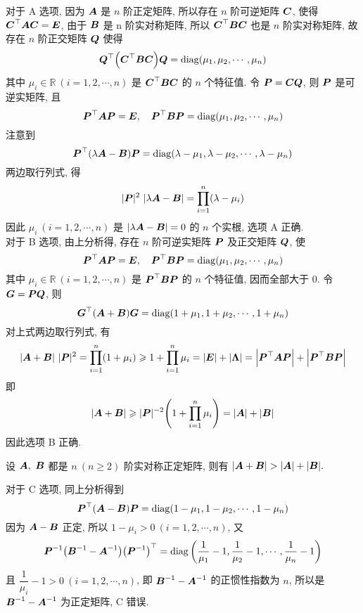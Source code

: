 \begin{solution}
    对于 A 选项, 因为 $\vb*{A}$ 是 $n$ 阶正定矩阵, 所以存在 $n$ 阶可逆矩阵 $\vb*{C}$, 使得 $\vb*{C}^\top\vb*{AC}=\vb*{E}$, 由于 $\vb*{B}$ 是 n 阶实对称矩阵, 所以 $\vb*{C}^\top\vb*{BC}$ 也是 $n$ 阶实对称矩阵, 故存在 $n$ 阶正交矩阵 $\vb*{Q}$ 使得 $$
    \vb*{Q}^\top\qty(\vb*{C}^\top\vb*{BC})\vb*{Q}=\operatorname{diag}(\mu_1, \mu_2, \cdots, \mu_n)
    $$
    其中 $\mu_i\in \mathbb{R}~(i=1,2, \cdots, n)$ 是 $\vb*{C}^\top\vb*{BC}$ 的 $n$ 个特征值. 令 $\vb*{P}=\vb*{CQ}$, 则 $\vb*{P}$ 是可逆实矩阵, 且 $$
    \vb*{P}^\top\vb*{AP}=\vb*{E},\quad \vb*{P}^\top\vb*{BP}=\operatorname{diag} (\mu_1, \mu_2, \cdots, \mu_n)
    $$
    注意到 $$
    \vb*{P}^\top(\lambda\vb*{A}-\vb*{B})\vb*{P}=\operatorname{diag} (\lambda-\mu_1, \lambda-\mu_2, \cdots, \lambda-\mu_n)
    $$
    两边取行列式, 得 $$
    |\vb*{P}|^2~|\lambda\vb*{A}-\vb*{B}|=\prod_{i=1}^{n}(\lambda-\mu_i)
    $$
    因此 $\mu_i~(i=1,2, \cdots, n)$ 是 $|\lambda\vb*{A}-\vb*{B}|=0$ 的 $n$ 个实根, 选项 A 正确. \\ 
    对于 B 选项, 由上分析得, 存在 $n$ 阶可逆实矩阵 $\vb*{P}$ 及正交矩阵 $\vb*{Q}$, 使 $$
    \vb*{P}^\top\vb*{AP}=\vb*{E},\quad \vb*{P}^\top\vb*{BP}=\operatorname{diag} (\mu_1, \mu_2, \cdots, \mu_n)
    $$
    其中 $\mu_i\in \mathbb{R}~(i=1,2, \cdots, n)$ 是 $\vb*{P}^\top\vb*{BP}$ 的 $n$ 个特征值, 因而全部大于 $0$. 令 $\vb*{G}=\vb*{PQ}$, 则 $$
    \vb*{G}^\top(\vb*{A}+\vb*{B})\vb*{G}=\operatorname{diag} (1+\mu_1, 1+\mu_2, \cdots, 1+\mu_n)
    $$
    对上式两边取行列式, 有 $$
    |\vb*{A}+\vb*{B}|~|\vb*{P}|^2=\prod_{i=1}^{n}(1+\mu_i)\geqslant 1+\prod_{i=1}^{n}\mu_i=|\vb*{E}|+|\vb*{\Lambda}|=\qty|\vb*{P}^\top\vb*{AP}|+\qty|\vb*{P}^\top\vb*{BP}|
    $$
    即 $$
    |\vb*{A}+\vb*{B}| \geqslant |\vb*{P}|^{-2}\qty(1+\prod_{i=1}^{n}\mu_i)=|\vb*{A}|+|\vb*{B}|
    $$
    因此选项 B 正确.
    \begin{inference}
    设 $\vb*{A},~\vb*{B}$ 都是 $n~(n\geqslant2)$ 阶实对称正定矩阵, 则有 $|\vb*{A}+\vb*{B}|>|\vb*{A}|+|\vb*{B}|.$
    \end{inference}
    对于 C 选项, 同上分析得到 $$
    \vb*{P}^\top(\vb*{A}-\vb*{B})\vb*{P}=\operatorname{diag}(1-\mu_1, 1-\mu_2, \cdots ,1-\mu_n)
    $$
    因为 $\vb*{A}-\vb*{B}$ 正定, 所以 $1-\mu_i>0~(i=1,2, \cdots ,n)$, 又 
    $$
    \vb*{P}^{-1}\qty(\vb*{B}^{-1}-\vb*{A}^{-1})\qty(\vb*{P}^{-1})^{\top}=\operatorname{diag}\qty(\dfrac{1}{\mu_1}-1, \dfrac{1}{\mu_2}-1, \cdots ,\dfrac{1}{\mu_n}-1)
    $$
    且 $\dfrac{1}{\mu_i}-1>0~(i=1,2, \cdots ,n)$, 即 $\vb*{B}^{-1}-\vb*{A}^{-1}$ 的正惯性指数为 $n$, 所以是 $\vb*{B}^{-1}-\vb*{A}^{-1}$ 为正定矩阵, C 错误. \\ 

\end{solution}
